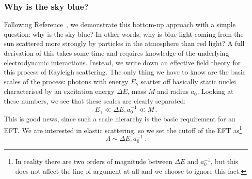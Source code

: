 




\subsubsection{Why is the sky blue?}

Following Reference~\cite{Kaplan:2005es}, we demonstrate this
bottom-up approach with a simple question: why is the sky blue?
In other words, why is blue light coming from the sun scattered more
strongly by particles in the atmosphere than red light?  A full
derivation of this takes some time and requires knowledge of the
underlying electrodynamic interactions. Instead, we write down an
effective field theory for this process of Rayleigh scattering. The
only thing we have to know are the basic scales of the process:
photons with energy $E_\gamma$ scatter off basically static nuclei
characterised by an excitation energy $\Delta E$, mass $M$ and radius
$a_0$. Looking at these numbers, we see that these scales are clearly
separated:
%
\begin{equation}
  E_\gamma \ll \Delta E,  a_0^{-1} \ll M \,.
\end{equation}
%
This is good news, since such a scale hierarchy is the basic
requirement for an EFT. We are interested in elastic scattering, so we
set the cutoff of the EFT as\footnote{In reality there are two orders
  of magnitude between $\Delta E$ and $a_0^{-1}$, but this does not
  affect the line of argument at all and we choose to ignore this
  fact.}
\begin{equation}
  \Lambda \sim \Delta E, a_0^{-1} \,.
\end{equation}

